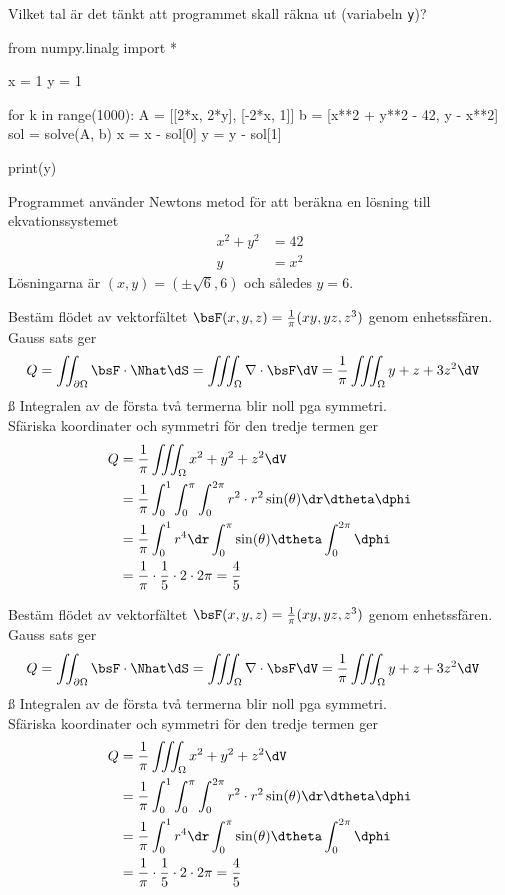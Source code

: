 Vilket tal är det tänkt att programmet skall räkna ut (variabeln \texttt{y})? \\
\begin{python}
from numpy.linalg import *

x = 1
y = 1

for k in range(1000):
    A = [[2*x, 2*y], [-2*x, 1]]
    b = [x**2 + y**2 - 42, y - x**2]
    sol = solve(A, b)
    x = x - sol[0]
    y = y - sol[1]

print(y)
\end{python}
Programmet använder Newtons metod för att beräkna en lösning till ekvationssystemet
\begin{align*}
  x^2 + y^2 &= 42 \\
  y &= x^2
\end{align*}
Lösningarna är $(x, y) = (\pm\sqrt{6}, 6)$ och således $y = 6$.
%

Bestäm flödet av vektorfältet $\bsF(x, y, z) = \frac{1}{\pi} (xy, yz, z^3)$
genom enhetssfären.
Gauss sats ger
\begin{align*}
  Q = \iint_{\partial\Omega} \bsF \cdot \Nhat \dS
  &= \iiint_{\Omega} \nabla \cdot \bsF \dV
    = \frac{1}{\pi} \iiint_{\Omega} y + z + 3z^2 \dV
\end{align*}ß
Integralen av de första två termerna blir noll pga symmetri. \\
Sfäriska koordinater och symmetri för den tredje termen ger
\begin{align*}
  Q &= \frac{1}{\pi} \iiint_{\Omega} x^2 + y^2 + z^2 \dV \\
    &= \frac{1}{\pi} \int_0^1 \int_0^{\pi} \int_0^{2\pi} r^2 \cdot
      r^2\sin(\theta)\dr\dtheta\dphi \\
    &= \frac{1}{\pi} \int_0^1 r^4 \dr \int_0^{\pi} \sin(\theta)
      \dtheta \int_0^{2\pi} \dphi \\
    &= \frac{1}{\pi} \cdot \frac{1}{5} \cdot 2 \cdot 2\pi
     = \frac{4}{5}
\end{align*}
%

Bestäm flödet av vektorfältet $\bsF(x, y, z) = \frac{1}{\pi} (xy, yz, z^3)$
genom enhetssfären.
Gauss sats ger
\begin{align*}
  Q = \iint_{\partial\Omega} \bsF \cdot \Nhat \dS
  &= \iiint_{\Omega} \nabla \cdot \bsF \dV
    = \frac{1}{\pi} \iiint_{\Omega} y + z + 3z^2 \dV
\end{align*}ß
Integralen av de första två termerna blir noll pga symmetri. \\
Sfäriska koordinater och symmetri för den tredje termen ger
\begin{align*}
  Q &= \frac{1}{\pi} \iiint_{\Omega} x^2 + y^2 + z^2 \dV \\
    &= \frac{1}{\pi} \int_0^1 \int_0^{\pi} \int_0^{2\pi} r^2 \cdot
      r^2\sin(\theta)\dr\dtheta\dphi \\
    &= \frac{1}{\pi} \int_0^1 r^4 \dr \int_0^{\pi} \sin(\theta)
      \dtheta \int_0^{2\pi} \dphi \\
    &= \frac{1}{\pi} \cdot \frac{1}{5} \cdot 2 \cdot 2\pi
     = \frac{4}{5}
\end{align*}
%

